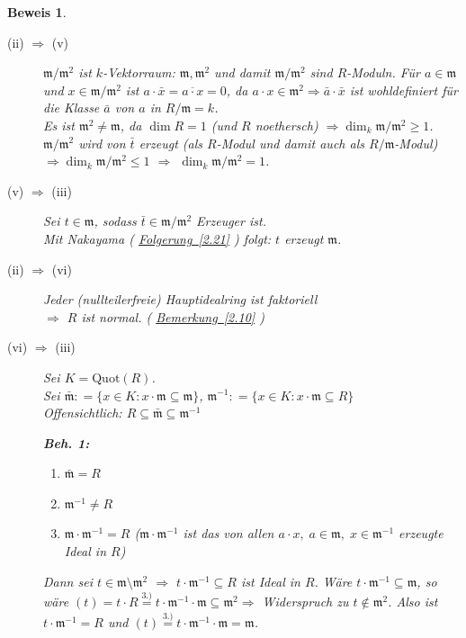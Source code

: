 \documentclass[a4paper,12pt]{scrbook}
\theoremstyle{break}
\theoremstyle{nonumberbreak}
\newtheorem{Bew}{Beweis}
\theoremstyle{nonumberplain}
\newcommand{\defeqr}[0]{\mathrel{\mathop:}=}
\newcommand{\myref}[2]{%
\hyperref[#2]{#1~\ref*{#2}}%
}
\begin{document}
\begin{Bew}
\begin{description}
\item[(ii) $\Rightarrow$ (v)] $\mathfrak{m}/\mathfrak{m}^2$ ist
$k$-Vektorraum: $\mathfrak{m}, \mathfrak{m}^2$ und damit
$\mathfrak{m}/\mathfrak{m}^2$ sind $R$-Moduln.
Für $a \in \mathfrak{m}$ und $x \in \mathfrak{m}/\mathfrak{m}^2$ ist $a \cdot
\bar{x} = \overline{a \cdot x} = 0$, da $a \cdot x \in \mathfrak{m}^2
\Rightarrow \bar{a} \cdot \bar{x}$ ist wohldefiniert für die Klasse $\bar{a}$
von $a$ in $R/\mathfrak{m} = k$.\\
Es ist $\mathfrak{m}^2 \not= \mathfrak{m}$, da $\dim R = 1$ (und $R$ noethersch)
$\Rightarrow \dim_k \mathfrak{m} / \mathfrak{m}^2 \geq 1$.\\
$\mathfrak{m}/\mathfrak{m}^2$ wird von $\bar{t}$ erzeugt (als $R$-Modul und
damit auch als $R/\mathfrak{m}$-Modul) $\Rightarrow \dim_k \mathfrak{m}/
\mathfrak{m}^2 \leq 1$ $\Rightarrow$ $\dim_k \mathfrak{m}/\mathfrak{m}^2 = 1$.

\item[(v) $\Rightarrow$ (iii)]
Sei $t \in \mathfrak{m}$, sodass $\bar{t} \in \mathfrak{m}/\mathfrak{m}^2$ Erzeuger ist.\\
Mit Nakayama (\myref{Folgerung}{2.21}) folgt: $t$ erzeugt $\mathfrak{m}$.

\item[(ii) $\Rightarrow$ (vi)]
Jeder (nullteilerfreie) Hauptidealring ist faktoriell\\
$\Rightarrow$ $R$ ist normal. (\myref{Bemerkung}{2.10})

\item[(vi) $\Rightarrow$ (iii)]
Sei $K = \mathrm{Quot}(R)$.\\
Sei $\bar{\mathfrak{m}} \defeqr \{x \in K: x \cdot \mathfrak{m} \subseteq
\mathfrak{m}\}$, $\mathfrak{m^{-1}} \defeqr \{x \in K: x \cdot \mathfrak{m}
\subseteq R\}$\\
Offensichtlich: $R \subseteq \bar{\mathfrak{m}} \subseteq \mathfrak{m}^{-1}$

\textbf{Beh. 1:}
\vspace{-0.7em}
\begin{enumerate}
  \item[1.)] $\bar{\mathfrak{m}} = R$
  \item[2.)] $\mathfrak{m}^{-1} \not= R$
  \item[3.)] $\mathfrak{m} \cdot \mathfrak{m}^{-1} = R$ ($\mathfrak{m} \cdot
  \mathfrak{m}^{-1}$ ist das von allen $a \cdot x, \; a \in \mathfrak{m}, \; x
  \in \mathfrak{m}^{-1}$ erzeugte Ideal in $R$)
\end{enumerate}
\vspace{-0.7em}
Dann sei $t \in \mathfrak{m} \setminus \mathfrak{m}^2$ $\Rightarrow$ $t \cdot
\mathfrak{m}^{-1} \subseteq R$ ist Ideal in $R$.
Wäre $ t \cdot \mathfrak{m}^{-1} \subseteq \mathfrak{m}$, so wäre $(t) = t \cdot
R \overset{\text{3.)}}{=} t \cdot \mathfrak{m}^{-1} \cdot \mathfrak{m} \subseteq
\mathfrak{m}^2 \Rightarrow$ Widerspruch zu $t \not\in \mathfrak{m}^2$.
Also ist $t \cdot \mathfrak{m}^{-1} = R$ und $(t) \overset{\text{3.)}}{=} t \cdot
\mathfrak{m}^{-1} \cdot \mathfrak{m} = \mathfrak{m}$.


\end{description}
\end{Bew}
\end{document}
